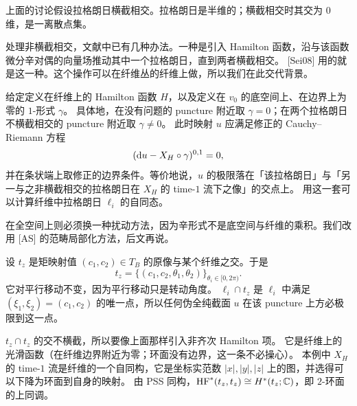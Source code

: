 \begin{remark}\label{c7:rem-nontransverse}
上面的讨论假设拉格朗日横截相交。拉格朗日是半维的；横截相交时其交为 $0$ 维，是一离散点集。

处理非横截相交，文献中已有几种办法。一种是引入 Hamilton 函数，沿与该函数微分辛对偶的向量场推动其中一个拉格朗日，直到两者横截相交。
[Sei08] 用的就是这一种。这个操作可以在纤维丛的纤维上做，所以我们在此交代背景。

给定定义在纤维上的 Hamilton 函数 $H$，以及定义在 $v_0$ 的底空间上、在边界上为零的 $1$-形式 $\gamma$。
具体地，在没有问题的 puncture 附近取 $\gamma=0$；在两个拉格朗日不横截相交的 puncture 附近取 $\gamma\neq0$。
此时映射 $u$ 应满足修正的 Cauchy--Riemann 方程
\begin{equation*}
(\mathrm{d} u-X_H\circ\gamma)^{0,1}=0,
\end{equation*}
并在条状端上取修正的边界条件。等价地说，$u$ 的极限落在「该拉格朗日」与「另一与之非横截相交的拉格朗日在 $X_H$ 的 time-$1$ 流下之像」的交点上。
用这一套可以计算纤维中拉格朗日 $\ell_i$ 的自同态。

在全空间上则必须换一种扰动方法，因为辛形式不是底空间与纤维的乘积。我们改用 [AS] 的范畴局部化方法，后文再说。
\end{remark}


\begin{example}\label{c7:ex-tz}
设 $t_z$ 是矩映射值 $(c_1,c_2)\in T_B$ 的原像与某个纤维之交。于是
\[
t_z=\{(c_1,c_2,\theta_1,\theta_2)\}_{\theta_i\in[0,2\pi)} .
\]
它对平行移动不变，因为平行移动只是转动角度。
$\ell_i\cap t_z$ 是 $\ell_i$ 中满足 $(\xi_1,\xi_2)=(c_1,c_2)$ 的唯一点，所以任何伪全纯截面 $u$ 在该 puncture 上方必极限到这一点。
\end{example}


\begin{example}\label{c7:ex-tz-self}
$t_z\cap t_z$ 的交不横截，所以要像上面那样引入非齐次 Hamilton 项。
它是纤维上的光滑函数（在纤维边界附近为零；环面没有边界，这一条不必操心）。
本例中 $X_H$ 的 time-$1$ 流是纤维的一个自同构，它是坐标实范数 $|x|,|y|,|z|$ 上的图，并选得可以下降为环面到自身的映射。
由 PSS 同构，$\mathrm{HF}^*(t_z,t_z)\cong H^*(t_z;\mathbb{C})$，即 $2$-环面的上同调。
\end{example}

